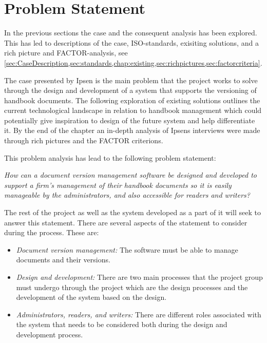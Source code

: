 \section{Problem Statement} \label{problemstatement}
In the previous sections the case and the consequent analysis has been explored.
This has led to descriptions of the case, ISO-standards, exisiting solutions, and a rich picture and FACTOR-analysis, see \cref{sec:CaseDescription,sec:standards,chap:existing,sec:richpictures,sec:factorcriteria}.

The case presented by Ipsen is the main problem that the project works to solve through the design and development of a system that supports the versioning of handbook documents. 
The following exploration of existing solutions outlines the current technological landscape in relation to handbook management which could potentially give inspiration to design of the future system and help differentiate it.
By the end of the chapter an in-depth analysis of Ipsens interviews were made through rich pictures and the FACTOR criterions.

This problem analysis has lead to the following problem statement:

\begin{center}
\textit{How can a document version management software be designed and developed to support a firm's management of their handbook documents so it is easily manageable by the administrators, and also accessible for readers and writers?}
\end{center}

The rest of the project as well as  the system developed as a part of it will seek to answer this statement.
There are several aspects of the statement to consider during the process.
These are:
\begin{itemize}
	\item \textit{Document version management:} The software must be able to manage documents and their versions.
	\item \textit{Design and development:} There are two main processes that the project group must undergo through the project which are the design processes and the development of the system based on the design.
	\item \textit{Administrators, readers, and writers:} There are different roles associated with the system that needs to be considered both during the design and development process.
\end{itemize}
